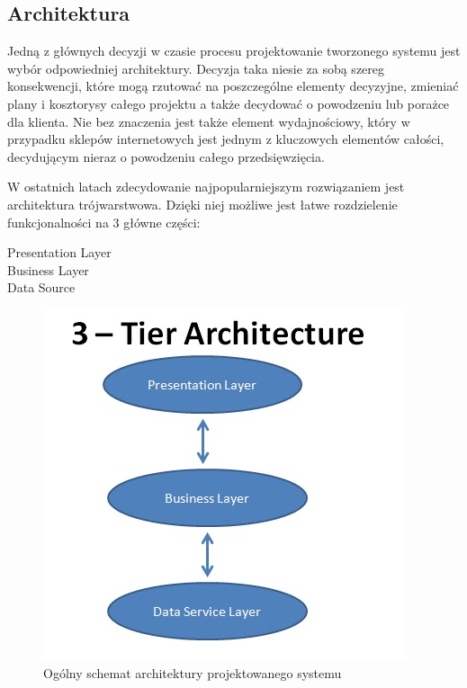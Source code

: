 \subsection{Architektura}

Jedną z głównych decyzji w czasie procesu projektowanie tworzonego systemu jest
wybór odpowiedniej architektury. Decyzja taka niesie za sobą szereg
konsekwencji, które mogą rzutować na poszczególne elementy decyzyjne, zmieniać
plany i kosztorysy całego projektu a także decydować o powodzeniu lub porażce
dla klienta. Nie bez znaczenia jest także element wydajnościowy, który w
przypadku sklepów internetowych jest jednym z kluczowych elementów całości,
decydującym nieraz o powodzeniu całego przedsięwzięcia.

W ostatnich latach zdecydowanie najpopularniejszym rozwiązaniem jest
architektura trójwarstwowa. Dzięki niej możliwe jest łatwe rozdzielenie
funkcjonalności na 3 główne części:
\begin{description}
	\item[Presentation Layer]
	\item[Business Layer]
	\item[Data Source]
\end{description}

\begin{figure}[h!]
    \includegraphics[width=\textwidth,
    height=0.5\textheight]{graphics/threetier.jpg}
  \caption{Ogólny schemat architektury projektowanego systemu}
\end{figure}

